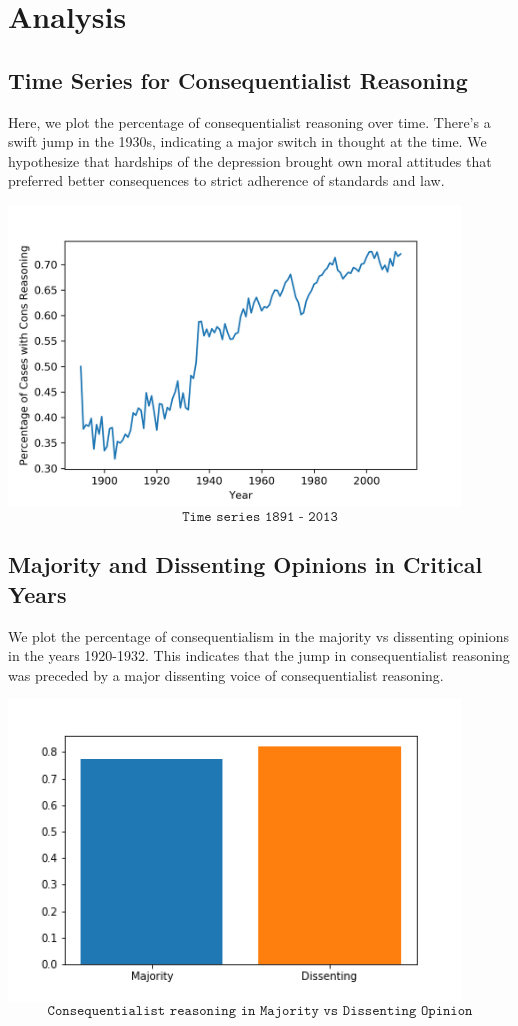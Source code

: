 \documentclass{article}
\begin{document}
\section{Analysis}

\subsection{Time Series for Consequentialist Reasoning}
Here, we plot the percentage of consequentialist reasoning over time. There's a swift jump in the 1930s, indicating a major switch in thought at the time. We hypothesize that hardships of the depression brought own moral attitudes that preferred better consequences to strict adherence of standards and law.
\begin{center}
\includegraphics[width = 12cm, height = 8cm]{timeseries.png}
    \[\texttt{Time series 1891 - 2013}\]
\end{center}

\subsection{Majority and Dissenting Opinions in Critical Years}
We plot the percentage of consequentialism in the majority vs dissenting opinions in the years 1920-1932. This indicates that the jump in consequentialist reasoning was preceded by a major dissenting voice of consequentialist reasoning.
\begin{center}
\includegraphics[width = 12cm, height = 8cm]{MajDis.png}
    \[\texttt{Consequentialist reasoning in Majority vs Dissenting Opinion}\]
\end{center}
\end{document}
